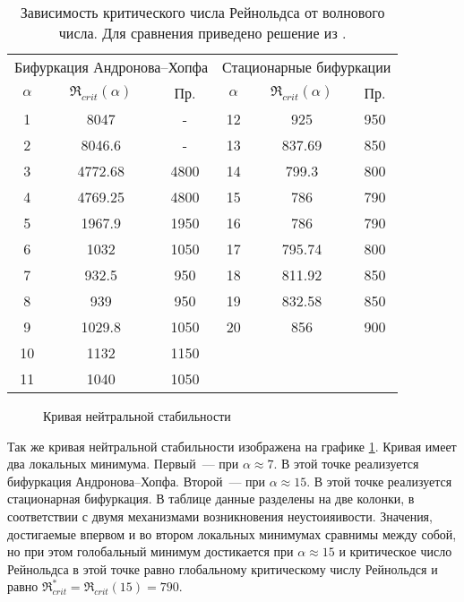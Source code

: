 \begin{table}
 \begin{tabular}{cccccc}
\hline
\hline
  \multicolumn{3}{c}{Бифуркация Андронова--Хопфа} & \multicolumn{3}{c}{Стационарные бифуркации} \\
  $\alpha$&	$\Re_{crit}(\alpha)$ \cite{lin-stability}&  Пр.&	$\alpha$&	$\Re_{crit}(\alpha)$ \cite{lin-stability}&  Пр. \\
\hline
  1&	8047&		-&	12&	925&		950\\ 
  2&	8046.6&		-&	13&	837.69&		850\\
  3&	4772.68&	4800&	14&	799.3&		800\\
  4&	4769.25&	4800&	15&	786&		790\\
  5&	1967.9&		1950&	16&	786&		790\\
  6&	1032&		1050&	17&	795.74&		800\\
  7&	932.5&		950&	18&	811.92&		850\\
  8&	939&		950&	19&	832.58&		850\\
  9&	1029.8&		1050&	20&	856&		900\\
  10&	1132&		1150\\
  11&	1040&		1050\\
\hline
 \end{tabular}
 \caption{Зависимость критического числа Рейнольдса от волнового числа. Для сравнения приведено решение из \cite{lin-stability}. }
 \label{Re_al}
\end{table}

\begin{figure}
  \center
  
  \caption{Кривая нейтральной стабильности}
  \label{graph:Re_al}
\end{figure}

Так же кривая нейтральной стабильности изображена на графике \ref{graph:Re_al}. Кривая имеет два локальных минимума. Первый~--- при $\alpha \approx 7 $. В этой точке реализуется бифуркация Андронова--Хопфа. Второй~--- при $\alpha \approx 15$. В этой точке реализуется стационарная бифуркация. В таблице данные разделены на две колонки, в соответствии с двумя механизмами возникновения неустоияивости.  Значения, достигаемые впервом и во втором локальных минимумах сравнимы между собой, но при этом голобальный минимум достикается при $\alpha \approx 15$ и критическое число Рейнольдса в этой точке равно глобальному критическому числу Рейнольдся и равно $\Re_{crit}^* = \Re_{crit}(15) = 790$. 

